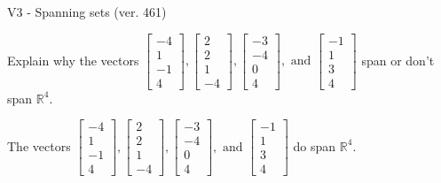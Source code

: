 \begin{exercise}
  \begin{exerciseTitle}V3 - Spanning sets (ver. 461)\end{exerciseTitle}
  \begin{exerciseStatement}
    Explain why the vectors \(\left[\begin{array}{r}
-4 \\
1 \\
-1 \\
4
\end{array}\right] , \left[\begin{array}{r}
2 \\
2 \\
1 \\
-4
\end{array}\right] , \left[\begin{array}{r}
-3 \\
-4 \\
0 \\
4
\end{array}\right] , \text{ and } \left[\begin{array}{r}
-1 \\
1 \\
3 \\
4
\end{array}\right]\) span or don't span \(\mathbb{R}^4\). 
	


  \end{exerciseStatement}
  \begin{exerciseAnswer}
   The vectors \(\left[\begin{array}{r}
-4 \\
1 \\
-1 \\
4
\end{array}\right] , \left[\begin{array}{r}
2 \\
2 \\
1 \\
-4
\end{array}\right] , \left[\begin{array}{r}
-3 \\
-4 \\
0 \\
4
\end{array}\right] , \text{ and } \left[\begin{array}{r}
-1 \\
1 \\
3 \\
4
\end{array}\right]\) 
  	 do  
	span \(\mathbb{R}^4\).
  


  \end{exerciseAnswer}
\end{exercise}
